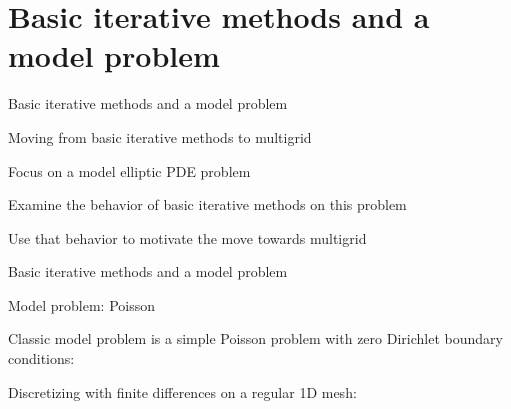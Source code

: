 \documentclass[18pt,xcolor=table]{beamer}
\begin{document}
\section{Basic iterative methods and a model problem}


\begin{frame}{Basic iterative methods and a model problem}
\begin{block}{Moving from basic iterative methods to multigrid}
\bit
\item Focus on a model elliptic PDE problem
\item Examine the behavior of basic iterative methods on this problem
\item Use that behavior to motivate the move towards multigrid
\eit
\end{block}
\end{frame}

\begin{frame}{Basic iterative methods and a model problem}
\begin{block}{Model problem: Poisson}
\bit
\item Classic model problem is a simple Poisson problem with zero Dirichlet boundary conditions:
\item Discretizing with finite differences on a regular 1D mesh:
\eit
{}
\end{block}
\end{frame}
\end{document}
